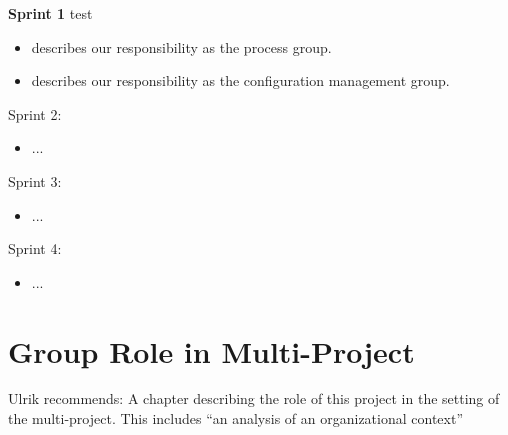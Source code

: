 \begin{documentorganization}
  \item \textbf{Sprint 1} test
  \begin{itemize}
    \item {} describes our responsibility as the process group.
    \item {} describes our responsibility as the configuration management group.
  \end{itemize}
  \item Sprint 2:
  \begin{itemize}
    \item ...
  \end{itemize}
  \item Sprint 3:
  \begin{itemize}
    \item ...
  \end{itemize}
  \item Sprint 4:
  \begin{itemize}
    \item ...
  \end{itemize}
\end{documentorganization}

\section{Group Role in Multi-Project}
Ulrik recommends: A chapter describing the role of this project in the setting of the multi-project. This includes ``an analysis of an organizational context''